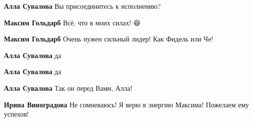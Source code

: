 \begin{itemize}
\begin{itemize}
\textbf{Алла Сувалова} Вы присоединитесь к исполнению?

 
\textbf{Максим Гольдарб} Всё, что в моих силах! 😆

 
\textbf{Максим Гольдарб} Очень нужен сильный лидер! Как Фидель или Че! 🤩

 
\textbf{Алла Сувалова} да

 
\textbf{Алла Сувалова} да

 
\textbf{Алла Сувалова} Так он перед Вами, Алла!

 
\textbf{Ирина Виноградова} Не сомневаюсь! Я верю в энергию Максима! Пожелаем ему успехов!

 

\end{itemize}
\end{itemize}
